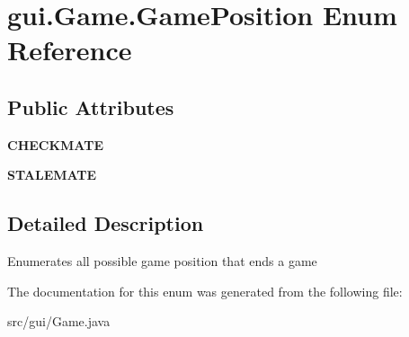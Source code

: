 \hypertarget{enumgui_1_1_game_1_1_game_position}{}\section{gui.\+Game.\+Game\+Position Enum Reference}
\label{enumgui_1_1_game_1_1_game_position}
\subsection*{Public Attributes}
\begin{DoxyCompactItemize}
\item 
\mbox{\label{enumgui_1_1_game_1_1_game_position_a92772e5b3c4aa815b09a7ec7cd12d037}} 
{\bfseries C\+H\+E\+C\+K\+M\+A\+TE}
\item 
\mbox{\label{enumgui_1_1_game_1_1_game_position_aa67aff4cb60dd5cfeadece85987cacbc}} 
{\bfseries S\+T\+A\+L\+E\+M\+A\+TE}
\end{DoxyCompactItemize}


\subsection{Detailed Description}
Enumerates all possible game position that ends a game 

The documentation for this enum was generated from the following file\+:\begin{DoxyCompactItemize}
\item 
src/gui/Game.\+java\end{DoxyCompactItemize}
